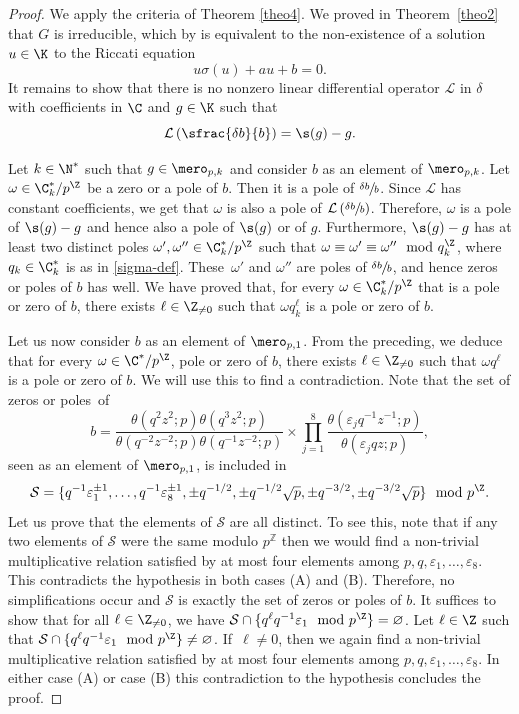 \begin{proof}
We apply the criteria of Theorem \ref{theo4}. We proved in Theorem~\ref{theo2} that $G$ is irreducible, which by \cite[Lem.\,13]{dreyfus2015galois} is equivalent to the non-existence of a solution $u\in\K$ to the Riccati equation
\[
u\sigma(u)+au+b=0.
\]
It remains to show that there is no nonzero linear differential operator $\mathcal{L}$ in $\delta$ with coefficients in $\C$ and $g\in \K$ such that
\[
\mathcal{L}\left(\sfrac{\delta b}{b}\right)=\s (g)-g.
\]

Let $k\in \N^{*}$ such that $g\in \mero_{p,k}$ and consider $b$ as an element of $\mero_{p,k}$. Let $\omega\in \C^{*}_{k}/p^{\Z}$ be a zero or a pole of $b$. Then it is a pole of $\sfrac{\delta b}{b}$. Since $\mathcal{L}$ has constant coefficients, we get that $\omega$ is also a pole of $\mathcal{L}\left(\sfrac{\delta b}{b}\right)$.
Therefore, $\omega$ is a pole of $\s(g)-g$ and hence also a pole of $\s(g)$ or of $g$. Furthermore, $\s(g)-g$ has at least two distinct poles $\omega',\omega''\in\C^{*}_k/p^{\Z}$ such that $\omega \equiv \omega' \equiv \omega''\mod q_k^{\Z}$, where $q_k\in\C^{*}_k$ is as in \eqref{sigma-def}. These~$\omega'$ and $\omega''$ are poles of $\sfrac{\delta b}{b}$, and hence zeros or poles of $b$ has well. We have proved that, for every $\omega\in \C^{*}_{k}/p^{\Z}$ that is a pole or zero of $b$, there exists $\ell\in \Z_{\neq 0}$ such that $\omega q_{k}^{\ell}$ is a pole or zero of $b$. \par
Let us now consider $b$ as an element of $\mero_{p,1}$. From the preceding, we deduce that for every $\omega\in \C^{*}/p^{\Z}$, pole or zero of $b$, there exists $\ell\in \Z_{\neq 0}$ such that $\omega q^{\ell}$ is a pole or zero of $b$.
We will use this to find a contradiction. Note that the set of zeros or poles~of
\[
b=\frac{\theta(q^{2}z^{2};p)\theta(q^{3}z^{2};p)}{\theta(q^{-2}z^{-2};p)\theta(q^{-1}z^{-2};p)}\times \prod_{j=1}^{8}\frac{\theta(\varepsilon_{j}q^{-1}z^{-1};p)}{\theta(\varepsilon_{j}qz;p)},
\]
seen as an element of $\mero_{p,1}$, is included in
\[
\mathcal{S}=\{q^{-1}\varepsilon_{1}^{\pm 1},\ldots,q^{-1}\varepsilon_{8}^{\pm 1}, \pm q^{-1/2}, \pm q^{-1/2}\sqrt{p}, \pm q^{-3/2}, \pm q^{-3/2}\sqrt{p}\} \mod p^{\Z}.
\]
Let us prove that the elements of $\mathcal{S}$ are all distinct. To see this, note that if any two elements of $\mathcal{S}$ were the same modulo $p^\mathbb{Z}$ then we would find a non-trivial multiplicative relation satisfied by at most four elements among $p,q,\varepsilon_{1},\dots,\varepsilon_{8}$. This contradicts the hypothesis in both cases (A) and (B). Therefore, no simplifications occur and $\mathcal{S}$ is exactly the set of zeros or poles of $b$.
It suffices to show that for all $\ell\in \Z_{\neq 0}$, we have ${\mathcal{S} \cap \{ q^{\ell} q^{-1}\varepsilon_{1} \mod p^\Z\}=\varnothing}$. Let $\ell\in \Z$ such that $\mathcal{S} \cap \{q^{\ell} q^{-1}\varepsilon_{1} \mod p^\Z\}\neq \varnothing$. If~$\ell\neq 0$, then we again find a non-trivial multiplicative relation satisfied by at most four elements among $p,q,\varepsilon_{1},\dots,\varepsilon_{8}$. In either case (A) or case (B) this contradiction to the hypothesis concludes the proof. \end{proof}

